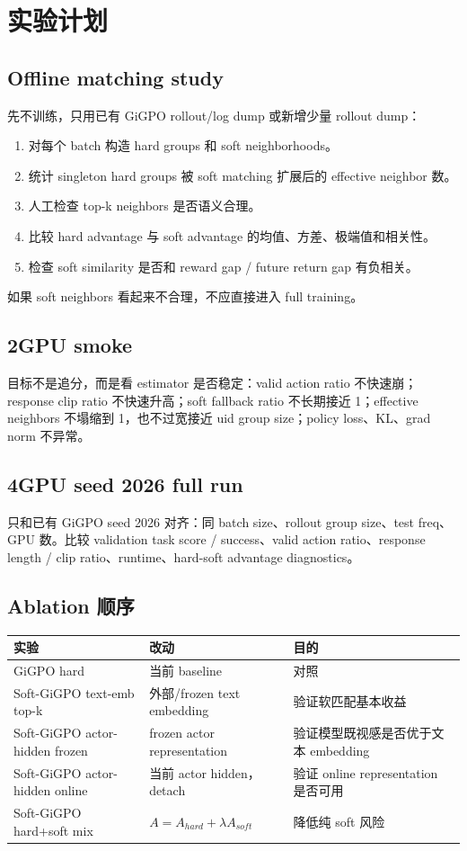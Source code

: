 \documentclass[10pt]{ctexart}
\begin{document}
\section{实验计划}
\subsection{Offline matching study}
先不训练，只用已有 GiGPO rollout/log dump 或新增少量 rollout dump：
\begin{enumerate}
  \item 对每个 batch 构造 hard groups 和 soft neighborhoods。
  \item 统计 singleton hard groups 被 soft matching 扩展后的 effective neighbor 数。
  \item 人工检查 top-k neighbors 是否语义合理。
  \item 比较 hard advantage 与 soft advantage 的均值、方差、极端值和相关性。
  \item 检查 soft similarity 是否和 reward gap / future return gap 有负相关。
\end{enumerate}
如果 soft neighbors 看起来不合理，不应直接进入 full training。

\subsection{2GPU smoke}
目标不是追分，而是看 estimator 是否稳定：valid action ratio 不快速崩；response clip ratio 不快速升高；soft fallback ratio 不长期接近 1；effective neighbors 不塌缩到 1，也不过宽接近 uid group size；policy loss、KL、grad norm 不异常。

\subsection{4GPU seed 2026 full run}
只和已有 GiGPO seed 2026 对齐：同 batch size、rollout group size、test freq、GPU 数。比较 validation task score / success、valid action ratio、response length / clip ratio、runtime、hard-soft advantage diagnostics。

\subsection{Ablation 顺序}
\begin{center}
\begin{tabular}{lll}
\toprule
实验 & 改动 & 目的 \\
\midrule
GiGPO hard & 当前 baseline & 对照 \\
Soft-GiGPO text-emb top-k & 外部/frozen text embedding & 验证软匹配基本收益 \\
Soft-GiGPO actor-hidden frozen & frozen actor representation & 验证模型既视感是否优于文本 embedding \\
Soft-GiGPO actor-hidden online & 当前 actor hidden，detach & 验证 online representation 是否可用 \\
Soft-GiGPO hard+soft mix & $A=A_{hard}+\lambda A_{soft}$ & 降低纯 soft 风险 \\
\bottomrule
\end{tabular}
\end{center}
\end{document}
